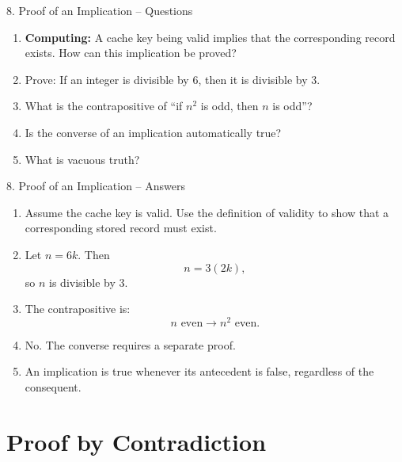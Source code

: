 \documentclass[aspectratio=169,11pt]{beamer}
\begin{document}
\begin{frame}{8. Proof of an Implication -- Questions}

\begin{enumerate}
\item \textbf{Computing:} A cache key being valid implies that the corresponding record exists. How can this implication be proved?

\item Prove: If an integer is divisible by 6, then it is divisible by 3.

\item What is the contrapositive of ``if $n^2$ is odd, then $n$ is odd''?

\item Is the converse of an implication automatically true?

\item What is vacuous truth?
\end{enumerate}

\end{frame}

\begin{frame}{8. Proof of an Implication -- Answers}

\begin{enumerate}
\item Assume the cache key is valid. Use the definition of validity to show that a corresponding stored record must exist.

\item Let $n=6k$. Then
\[
n=3(2k),
\]
so $n$ is divisible by 3.

\item The contrapositive is:
\[
n\text{ even}\to n^2\text{ even}.
\]

\item No. The converse requires a separate proof.

\item An implication is true whenever its antecedent is false, regardless of the consequent.
\end{enumerate}

\end{frame}


\section{Proof by Contradiction}
\end{document}
